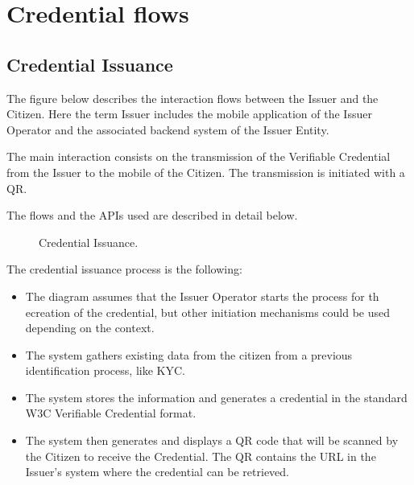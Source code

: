 \documentclass[a4paper,12pt,english,openany]{sphinxmanual}
\begin{document}
\section{Credential flows}
\label{\detokenize{privacycred:credential-flows}}

\subsection{Credential Issuance}
\label{\detokenize{privacycred:credential-issuance}}
\sphinxAtStartPar
The figure below describes the interaction flows between the Issuer and the Citizen. Here the term Issuer includes the mobile application of the Issuer Operator and the associated backend system of the Issuer Entity.

\sphinxAtStartPar
The main interaction consists on the transmission of the Verifiable Credential from the Issuer to the mobile of the Citizen. The transmission is initiated with a QR.

\sphinxAtStartPar
The flows and the APIs used are described in detail below.

\begin{figure}[htbp]
\centering
\capstart

\noindent{}
\caption{Credential Issuance.}\label{\detokenize{privacycred:id6}}\end{figure}

\sphinxAtStartPar
The credential issuance process is the following:

\sphinxAtStartPar
{}
\begin{itemize}
\item {} 
\sphinxAtStartPar
The diagram assumes that the Issuer Operator starts the process for th ecreation of the credential, but other initiation mechanisms could be used depending on the context.

\item {} 
\sphinxAtStartPar
The system gathers existing data from the citizen from a previous identification process, like KYC.

\item {} 
\sphinxAtStartPar
The system stores the information and generates a credential in the standard W3C Verifiable Credential format.

\item {} 
\sphinxAtStartPar
The system then generates and displays a QR code that will be scanned by the Citizen to receive the Credential. The QR contains the URL in the Issuer’s system where the credential can be retrieved.

\end{itemize}
\end{document}

